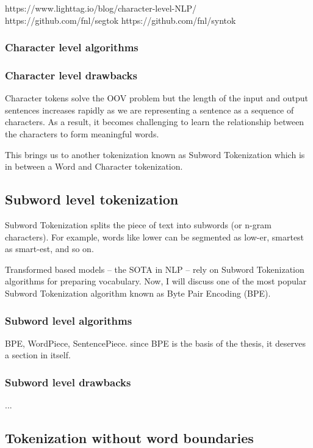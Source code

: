 https://www.lighttag.io/blog/character-level-NLP/
https://github.com/fnl/segtok
https://github.com/fnl/syntok

\subsubsection{Character level algorithms}

\subsubsection{Character level drawbacks}

Character tokens solve the OOV problem but the length of the input and output sentences increases rapidly as we are representing a sentence as a sequence of characters. As a result, it becomes challenging to learn the relationship between the characters to form meaningful words.

This brings us to another tokenization known as Subword Tokenization which is in between a Word and Character tokenization.

\subsection{Subword level tokenization}

Subword Tokenization splits the piece of text into subwords (or n-gram characters). For example, words like lower can be segmented as low-er, smartest as smart-est, and so on.

Transformed based models – the SOTA in NLP – rely on Subword Tokenization algorithms for preparing vocabulary. Now, I will discuss one of the most popular Subword Tokenization algorithm known as Byte Pair Encoding (BPE).

\subsubsection{Subword level algorithms}

BPE, WordPiece, SentencePiece. since BPE is the basis of the thesis, it deserves a section in itself.

\subsubsection{Subword level drawbacks}

...


\subsection{Tokenization without word boundaries}

